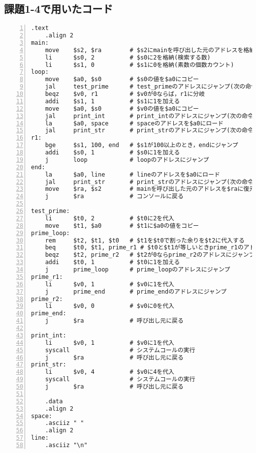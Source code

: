 \subsection{課題1-4で用いたコード} \label{sec:p1-4}
\begin{Verbatim}[numbers=left, xleftmargin=10mm, numbersep=6pt,
                    fontsize=\small, baselinestretch=0.8]
    .text
    .align 2
main:
    move    $s2, $ra        # $s2にmainを呼び出した元のアドレスを格納
    li      $s0, 2          # $s0に2を格納(検索する数)
    li      $s1, 0          # $s1に0を格納(素数の個数カウント)
loop:
    move    $a0, $s0        # $s0の値を$a0にコピー
    jal     test_prime      # test_primeのアドレスにジャンプ(次の命令のアドレスを$raに)
    beqz    $v0, r1         # $v0が0ならば，r1に分岐
    addi    $s1, 1          # $s1に1を加える
    move    $a0, $s0        # $v0の値を$a0にコピー
    jal     print_int       # print_intのアドレスにジャンプ(次の命令のアドレスを$raに)
    la      $a0, space      # spaceのアドレスを$a0にロード
    jal     print_str       # print_strのアドレスにジャンプ(次の命令のアドレスを$raに)
r1:
    bge     $s1, 100, end   # $s1が100以上のとき，endにジャンプ
    addi    $s0, 1          # $s0に1を加える
    j       loop            # loopのアドレスにジャンプ
end:
    la      $a0, line       # lineのアドレスを$a0にロード
    jal     print_str       # print_strのアドレスにジャンプ(次の命令のアドレスを$raに)
    move    $ra, $s2        # mainを呼び出した元のアドレスを$raに復元
    j       $ra             # コンソールに戻る

test_prime:
    li      $t0, 2          # $t0に2を代入
    move    $t1, $a0        # $t1に$a0の値をコピー
prime_loop:
    rem     $t2, $t1, $t0   # $t1を$t0で割った余りを$t2に代入する
    beq     $t0, $t1, prime_r1 # $t0と$t1が等しいときprime_r1のアドレスにジャンプ
    beqz    $t2, prime_r2   # $t2が0ならprime_r2のアドレスにジャンプ
    addi    $t0, 1          # $t0に1を加える
    j       prime_loop      # prime_loopのアドレスにジャンプ
prime_r1:
    li      $v0, 1          # $v0に1を代入
    j       prime_end       # prime_endのアドレスにジャンプ
prime_r2:
    li      $v0, 0          # $v0に0を代入
prime_end:
    j       $ra             # 呼び出し元に戻る

print_int:
    li      $v0, 1          # $v0に1を代入
    syscall                 # システムコールの実行
    j       $ra             # 呼び出し元に戻る
print_str:
    li      $v0, 4          # $v0に4を代入
    syscall                 # システムコールの実行
    j       $ra             # 呼び出し元に戻る

    .data
    .align 2
space:
    .asciiz " "
    .align 2
line:
    .asciiz "\n"
\end{Verbatim}


